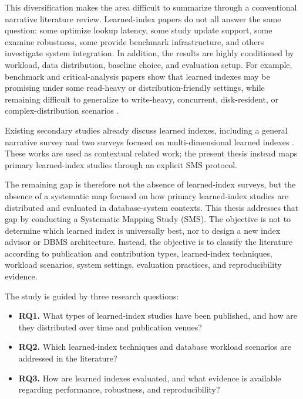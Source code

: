 \documentclass[a4paper, 12pt, twoside]{report}
\begin{document}
This diversification makes the area difficult to summarize through a conventional narrative literature review. Learned-index papers do not all answer the same question: some optimize lookup latency, some study update support, some examine robustness, some provide benchmark infrastructure, and others investigate system integration. In addition, the results are highly conditioned by workload, data distribution, baseline choice, and evaluation setup. For example, benchmark and critical-analysis papers show that learned indexes may be promising under some read-heavy or distribution-friendly settings, while remaining difficult to generalize to write-heavy, concurrent, disk-resident, or complex-distribution scenarios \cite{marcus2020benchmarking,sun2023learned,wongkham2022ready,lan2023disk,luo2025robustness}.

Existing secondary studies already discuss learned indexes, including a general narrative survey and two surveys focused on multi-dimensional learned indexes \cite{faraj2024survey,liu2025multidimensional,almamun2025survey}. These works are used as contextual related work; the present thesis instead maps primary learned-index studies through an explicit SMS protocol.

The remaining gap is therefore not the absence of learned-index surveys, but the absence of a systematic map focused on how primary learned-index studies are distributed and evaluated in database-system contexts. This thesis addresses that gap by conducting a Systematic Mapping Study (SMS). The objective is not to determine which learned index is universally best, nor to design a new index advisor or DBMS architecture. Instead, the objective is to classify the literature according to publication and contribution types, learned-index techniques, workload scenarios, system settings, evaluation practices, and reproducibility evidence.

The study is guided by three research questions:

\begin{itemize}
\item \textbf{RQ1.} What types of learned-index studies have been published, and how are they distributed over time and publication venues?
\item \textbf{RQ2.} Which learned-index techniques and database workload scenarios are addressed in the literature?
\item \textbf{RQ3.} How are learned indexes evaluated, and what evidence is available regarding performance, robustness, and reproducibility?
\end{itemize}
\end{document}
